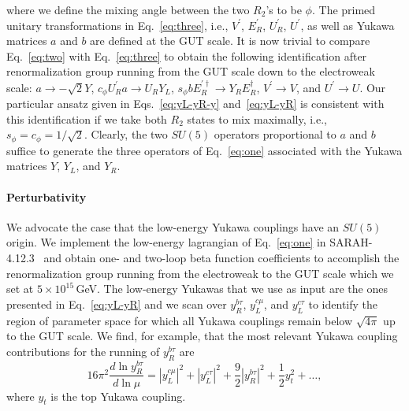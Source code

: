 \documentclass[aps,prd,superscriptaddress,twocolumn,secnumarabic]{revtex4-1}
\begin{document}
where we define the mixing angle between the two $R_2$'s to be $\phi$. The primed unitary transformations in Eq.~\eqref{eq:three}, i.e., $V^\prime$, $E_R^\prime$, $U^\prime_R$, $U^\prime$, as well as Yukawa matrices $a$ and $b$ are defined at the GUT scale. It is now trivial to compare Eq.~\eqref{eq:two} with Eq.~\eqref{eq:three} to obtain the following identification after renormalization group running from the GUT scale down to the electroweak scale: $a \rightarrow - \sqrt{2} Y$, $c_\phi U^\prime_R a \rightarrow U_R Y_{L}$, $ s_\phi b E_R^{\prime \dagger} \rightarrow Y_R E_R^\dagger$, $V^\prime \rightarrow V$, and $U^\prime \rightarrow U$. 
Our particular ansatz given in Eqs.~\eqref{eq:yL-yR-y} and~\eqref{eq:yL-yR} is consistent with this identification if we take both $R_2$ states to mix maximally, i.e., $s_\phi=c_\phi=1/\sqrt{2}$. Clearly, the two $SU(5)$ operators proportional to $a$ and $b$ suffice to generate the three operators of Eq.~\eqref{eq:one} associated with the Yukawa matrices $Y$, $Y_L$, and $Y_R$.

\paragraph*{Perturbativity} We advocate the case that the low-energy Yukawa couplings have an $SU(5)$ origin. We implement the low-energy lagrangian of Eq.~\eqref{eq:one} in SARAH-4.12.3~\cite{Staub:2013tta} and obtain one- and two-loop beta function coefficients to accomplish the renormalization group running from the electroweak to the GUT scale which we set at $5 \times 10^{15}$\,GeV. The low-energy Yukawas that we use as input are the ones presented in Eq.~\eqref{eq:yL-yR} and we scan over $y^{b\tau}_R$, $y^{c\mu}_L$, and $y^{c\tau}_L$ to identify the region of parameter space for which all Yukawa couplings remain below $\sqrt{4\pi}$ up to the GUT scale. We find, for example, that the most relevant Yukawa coupling contributions for the running of $y^{b\tau}_R$ are
\begin{equation*}
  16 \pi^2 \frac{d \ln y^{b\tau}_R}{d \ln \mu}=|y^{c\mu}_L|^2+|y^{c\tau}_L|^2+\frac{9}{2}|y^{b\tau}_R|^2+\frac{1}{2}y^{2}_t +\dots,
\end{equation*}
where $y_t$ is the top Yukawa coupling. 
\end{document}
